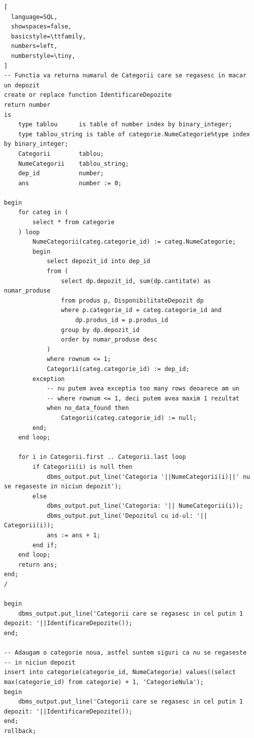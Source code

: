 \documentclass[12pt]{article}
\begin{document}
\begin{lstlisting}[
  language=SQL,
  showspaces=false,
  basicstyle=\ttfamily,
  numbers=left,
  numberstyle=\tiny,
]
-- Functia va returna numarul de Categorii care se regasesc in macar un depozit
create or replace function IdentificareDepozite
return number
is
    type tablou      is table of number index by binary_integer;
    type tablou_string is table of categorie.NumeCategorie%type index by binary_integer;
    Categorii        tablou;
    NumeCategorii    tablou_string;
    dep_id           number;
    ans              number := 0;
    
begin
    for categ in (
        select * from categorie
    ) loop
        NumeCategorii(categ.categorie_id) := categ.NumeCategorie;
        begin
            select depozit_id into dep_id
            from (
                select dp.depozit_id, sum(dp.cantitate) as numar_produse
                from produs p, DisponibilitateDepozit dp
                where p.categorie_id = categ.categorie_id and
                    dp.produs_id = p.produs_id
                group by dp.depozit_id
                order by numar_produse desc                    
            )
            where rownum <= 1;
            Categorii(categ.categorie_id) := dep_id;
        exception
            -- nu putem avea exceptia too many rows deoarece am un
            -- where rownum <= 1, deci putem avea maxim 1 rezultat
            when no_data_found then
                Categorii(categ.categorie_id) := null;
        end;
    end loop;
    
    for i in Categorii.first .. Categorii.last loop
        if Categorii(i) is null then
            dbms_output.put_line('Categoria '||NumeCategorii(i)||' nu se regaseste in niciun depozit');
        else
            dbms_output.put_line('Categoria: '|| NumeCategorii(i));
            dbms_output.put_line('Depozitul cu id-ul: '|| Categorii(i));
            ans := ans + 1;
        end if;
    end loop;
    return ans;
end;
/

begin
    dbms_output.put_line('Categorii care se regasesc in cel putin 1 depozit: '||IdentificareDepozite());
end;

-- Adaugam o categorie noua, astfel suntem siguri ca nu se regaseste
-- in niciun depozit
insert into categorie(categorie_id, NumeCategorie) values((select max(categorie_id) from categorie) + 1, 'CategorieNula');
begin
    dbms_output.put_line('Categorii care se regasesc in cel putin 1 depozit: '||IdentificareDepozite());
end;
rollback;
\end{lstlisting}
\end{document}
